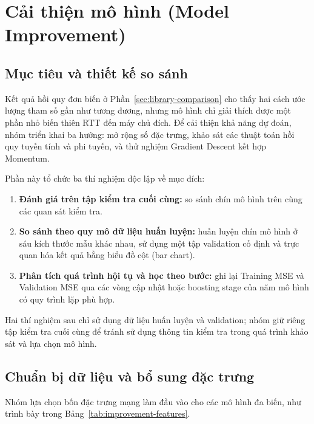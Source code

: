 
\section{Cải thiện mô hình (Model Improvement)}
\label{sec:model-improvement}

\subsection{Mục tiêu và thiết kế so sánh}

Kết quả hồi quy đơn biến ở Phần~\ref{sec:library-comparison}
cho thấy hai cách ước lượng tham số gần như tương đương,
nhưng mô hình chỉ giải thích được một phần nhỏ biến thiên
RTT đến máy chủ đích. Để cải thiện khả năng dự đoán, nhóm
triển khai ba hướng: mở rộng số đặc trưng, khảo sát các
thuật toán hồi quy tuyến tính và phi tuyến, và thử nghiệm
Gradient Descent kết hợp Momentum.

Phần này tổ chức ba thí nghiệm độc lập về mục đích:
\begin{enumerate}
    \item \textbf{Đánh giá trên tập kiểm tra cuối cùng:}
    so sánh chín mô hình trên cùng các quan sát kiểm tra.
    \item \textbf{So sánh theo quy mô dữ liệu huấn luyện:}
    huấn luyện chín mô hình ở sáu kích thước mẫu khác nhau,
    sử dụng một tập validation cố định và trực quan hóa kết quả
    bằng biểu đồ cột (bar chart).
    \item \textbf{Phân tích quá trình hội tụ và học theo bước:}
    ghi lại Training MSE và Validation MSE qua các vòng cập nhật
    hoặc boosting stage của năm mô hình có quy trình lặp phù hợp.
\end{enumerate}

Hai thí nghiệm sau chỉ sử dụng dữ liệu huấn luyện và validation;
nhóm giữ riêng tập kiểm tra cuối cùng để tránh sử dụng thông tin
kiểm tra trong quá trình khảo sát và lựa chọn mô hình.

\subsection{Chuẩn bị dữ liệu và bổ sung đặc trưng}

Nhóm lựa chọn bốn đặc trưng mạng làm đầu vào cho các mô hình
đa biến, như trình bày trong Bảng~\ref{tab:improvement-features}.


